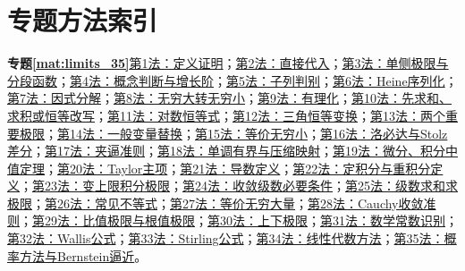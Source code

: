 \section{专题方法索引}
\par\noindent\textbf{专题\ref{mat:limits_35}}\quad \hyperref[mat:limits_35:k01]{第1法：定义证明}；\hyperref[mat:limits_35:k02]{第2法：直接代入}；\hyperref[mat:limits_35:k03]{第3法：单侧极限与分段函数}；\hyperref[mat:limits_35:k04]{第4法：概念判断与增长阶}；\hyperref[mat:limits_35:k05]{第5法：子列判别}；\hyperref[mat:limits_35:k06]{第6法：Heine序列化}；\hyperref[mat:limits_35:k07]{第7法：因式分解}；\hyperref[mat:limits_35:k08]{第8法：无穷大转无穷小}；\hyperref[mat:limits_35:k09]{第9法：有理化}；\hyperref[mat:limits_35:k10]{第10法：先求和、求积或恒等改写}；\hyperref[mat:limits_35:k11]{第11法：对数恒等式}；\hyperref[mat:limits_35:k12]{第12法：三角恒等变换}；\hyperref[mat:limits_35:k13]{第13法：两个重要极限}；\hyperref[mat:limits_35:k14]{第14法：一般变量替换}；\hyperref[mat:limits_35:k15]{第15法：等价无穷小}；\hyperref[mat:limits_35:k16]{第16法：洛必达与Stolz差分}；\hyperref[mat:limits_35:k17]{第17法：夹逼准则}；\hyperref[mat:limits_35:k18]{第18法：单调有界与压缩映射}；\hyperref[mat:limits_35:k19]{第19法：微分、积分中值定理}；\hyperref[mat:limits_35:k20]{第20法：Taylor主项}；\hyperref[mat:limits_35:k21]{第21法：导数定义}；\hyperref[mat:limits_35:k22]{第22法：定积分与重积分定义}；\hyperref[mat:limits_35:k23]{第23法：变上限积分极限}；\hyperref[mat:limits_35:k24]{第24法：收敛级数必要条件}；\hyperref[mat:limits_35:k25]{第25法：级数求和求极限}；\hyperref[mat:limits_35:k26]{第26法：常见不等式}；\hyperref[mat:limits_35:k27]{第27法：等价无穷大量}；\hyperref[mat:limits_35:k28]{第28法：Cauchy收敛准则}；\hyperref[mat:limits_35:k29]{第29法：比值极限与根值极限}；\hyperref[mat:limits_35:k30]{第30法：上下极限}；\hyperref[mat:limits_35:k31]{第31法：数学常数识别}；\hyperref[mat:limits_35:k32]{第32法：Wallis公式}；\hyperref[mat:limits_35:k33]{第33法：Stirling公式}；\hyperref[mat:limits_35:k34]{第34法：线性代数方法}；\hyperref[mat:limits_35:k35]{第35法：概率方法与Bernstein逼近}。\par
